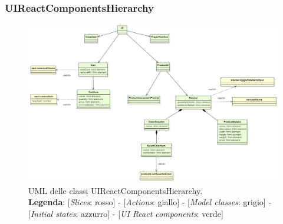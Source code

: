 \begin{landscape}
\thispagestyle{empty}
\subsubsection{UIReactComponentsHierarchy}
\begin{figure}[H]
	\centering
	\includegraphics[scale=0.7, keepaspectratio]{./res/images/UIReactComponentsHierarchy.PNG}
	\caption[UML delle classi UIReactComponentsHierarchy]{
	UML delle classi UIReactComponentsHierarchy.
	\\
	\textbf{Legenda}: 
	[\textit{Slices}: rosso] -
	[\textit{Actions}: giallo] -
	[\textit{Model classes}: grigio] -
	[\textit{Initial states}: azzurro] -
	[\textit{UI React components}: verde]}
\end{figure}
\end{landscape}
\restoregeometry

